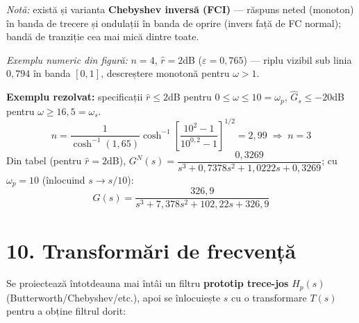\documentclass[10pt,a4paper]{article}
\begin{document}
\textit{Notă:} există și varianta \textbf{Chebyshev inversă (FCI)} — răspuns neted (monoton) în banda de trecere și ondulații în banda de oprire (invers față de FC normal); bandă de tranziție cea mai mică dintre toate.

\begin{center}
\hfill
{}
\end{center}
\textit{Exemplu numeric din figură:} $n=4$, $\hat r=2$dB ($\varepsilon=0{,}765$) — riplu vizibil sub linia $0{,}794$ în banda $[0,1]$, descreștere monotonă pentru $\omega>1$.

\textbf{Exemplu rezolvat:} specificații $\hat r\le2$dB pentru $0\le\omega\le10=\omega_p$, $\hat G_s\le-20$dB pentru $\omega\ge16{,}5=\omega_s$.
$$n=\dfrac{1}{\cosh^{-1}(1{,}65)}\cosh^{-1}\!\left[\dfrac{10^{2}-1}{10^{0,2}-1}\right]^{1/2}=2{,}99 \;\Rightarrow\; n=3$$
Din tabel (pentru $\hat r=2$dB), $G^N(s)=\dfrac{0{,}3269}{s^3+0{,}7378s^2+1{,}0222s+0{,}3269}$; cu $\omega_p=10$ (înlocuind $s\to s/10$):
$$G(s)=\dfrac{326{,}9}{s^3+7{,}378s^2+102{,}22s+326{,}9}$$

\section*{10. Transformări de frecvență}
Se proiectează întotdeauna mai întâi un filtru \textbf{prototip trece-jos} $H_p(s)$ (Butterworth/Chebyshev/etc.), apoi se înlocuiește $s$ cu o transformare $T(s)$ pentru a obține filtrul dorit:
\end{document}

